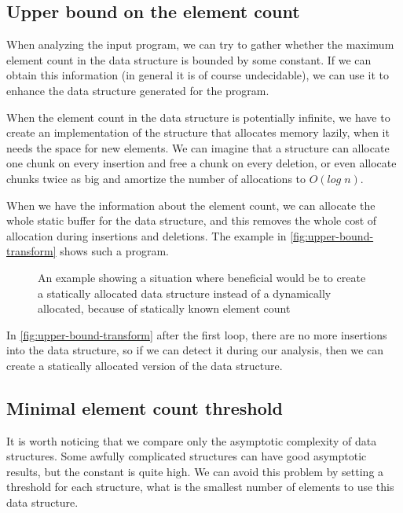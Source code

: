\documentclass[a4paper,11pt]{article}
\begin{document}
            
	\subsection{Upper bound on the element count}

		When analyzing the input program, we can try to gather whether the maximum element count in the
		data structure is bounded by some constant. If we can obtain this information (in general it is of course undecidable), we can use it to enhance the data structure generated for the program.

		When the element count in the data structure is potentially infinite, we have to create an
		implementation of the structure that allocates memory lazily, when it needs the space for new elements.
		We can imagine that a structure can allocate one chunk on every insertion and free a chunk on every
		deletion, or even allocate chunks twice as big and amortize the number of allocations to $O(log \; n)$.

		When we have the information about the element count, we can allocate the whole static buffer for the
		data structure, and this removes the whole cost of allocation during insertions and deletions. The
		example in \autoref{fig:upper-bound-transform} shows such a program.

		\begin{figure}
			

			\caption{An example showing a situation where beneficial would be to create a statically allocated data
			structure instead of a dynamically allocated, because of statically known element count}

			\label{fig:upper-bound-transform}
		\end{figure}

		In \autoref{fig:upper-bound-transform} after the first loop, there are no more insertions into the data
		structure, so if we can detect it during our analysis, then we can create a statically allocated version of the data structure.

	\subsection{Minimal element count threshold}

		It is worth noticing that we compare only the asymptotic complexity of data structures. Some awfully
		complicated structures can have good asymptotic results, but the constant is quite high. We can avoid
		this problem by setting a threshold for each structure, what is the smallest number of elements to use
		this data structure.
\end{document}
